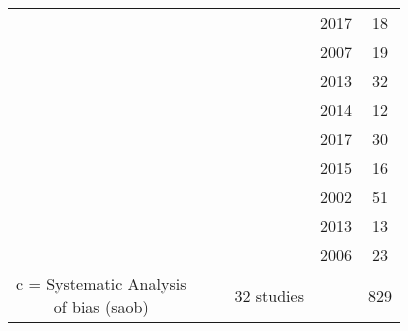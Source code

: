 \begin{tabular}{ cccccc }
 & & & \citeauthor{Lee2017} & 2017 & 18 \\
 & & & \citeauthor{Leins2007} & 2007 & 19 \\
 & & & \citeauthor{Li2013} & 2013 & 32 \\
 & & & \citeauthor{Meisel2014} & 2014 & 12 \\
 & & & \citeauthor{Mohagheghi2017} & 2017 & 30 \\
 & & & \citeauthor{Mohammadi2015} & 2015 & 16 \\
 & & & \citeauthor{Monastra2002} & 2002 & 51 \\
 & & & \citeauthor{Ogrim2013} & 2013 & 13 \\
 & & & \citeauthor{Strehl2006} & 2006 & 23 \\
 \shortstack{c = Systematic Analysis \\ of bias (\gls{saob})} & & & 32 studies & & 829 \\
\bottomrule
\end{tabular}
